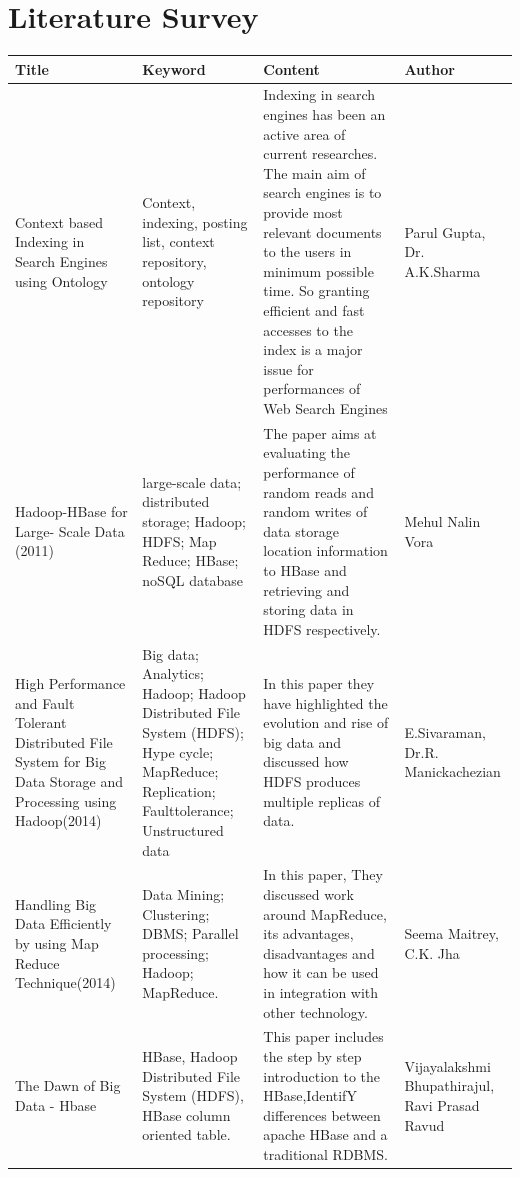 \documentclass[oneside,a4paper,12pt]{report}
\begin{document}
\section{Literature Survey}
{\tabulinesep=2mm
   \begin{longtabu} { |p{3.5cm} | p{3.5cm} | p{4cm }| p{2.5cm }|}
       \hline

\textbf{Title} & \textbf{Keyword} & \textbf{Content} & \textbf{Author}\\ \hline
Context based Indexing in Search Engines using Ontology &
Context, indexing, posting list, context repository, ontology repository &
Indexing in search engines has been an active area of current researches. The main aim of search engines is to provide most relevant documents to the users in minimum possible time. So granting efficient and fast accesses to the index is a major issue for performances of Web Search Engines &
Parul Gupta, Dr. A.K.Sharma \\ \hline

Hadoop-HBase for Large- Scale  Data (2011) &
large-scale  data;  distributed  storage;  Hadoop; HDFS; Map Reduce; HBase; noSQL database &
The  paper  aims  at evaluating the performance of random reads and random writes of data storage location information to HBase and retrieving and storing  data  in  HDFS  respectively. &
Mehul Nalin Vora \\ \hline

High Performance and Fault Tolerant Distributed File System for Big Data Storage and Processing using Hadoop(2014) &
Big data; Analytics; Hadoop; Hadoop Distributed File System (HDFS); Hype cycle; MapReduce; Replication; Faulttolerance; Unstructured data &
In this paper they have highlighted the evolution and rise of big data  and discussed how HDFS produces multiple replicas of data. &
E.Sivaraman, Dr.R. Manickachezian \\ \hline

Handling Big Data Efficiently by using Map Reduce Technique(2014) &
Data Mining; Clustering; DBMS; Parallel processing; Hadoop; MapReduce. &
 In this paper, They discussed work around MapReduce, its advantages, disadvantages and how it can be used in integration with other technology. &
Seema Maitrey, C.K. Jha \\ \hline

The Dawn of Big Data - Hbase &
HBase, Hadoop Distributed File System (HDFS), HBase column oriented table. &
This paper includes the step by step introduction to the HBase,IdentifY differences between apache HBase and a traditional RDBMS. &
Vijayalakshmi Bhupathirajul, Ravi Prasad Ravud \\ \hline
      
   \end{longtabu}
}
\end{document}
